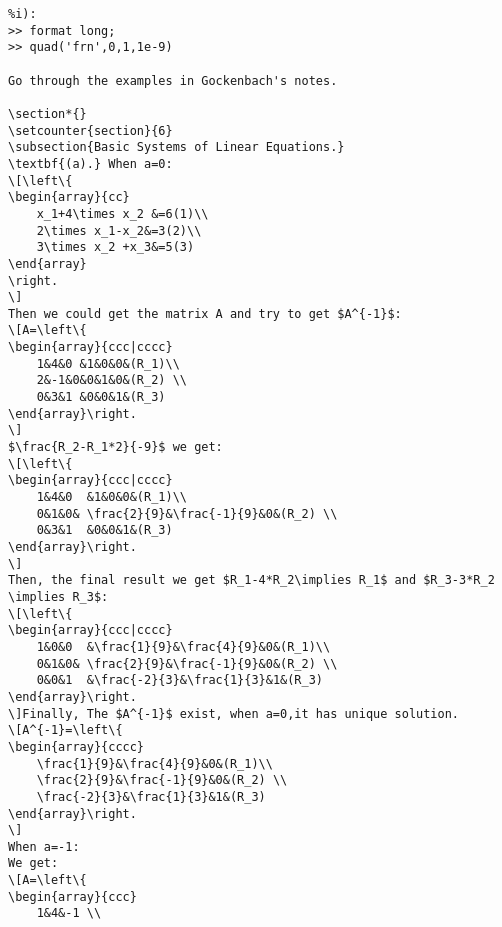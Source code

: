 \begin{verbatim}
%i):
>> format long;
>> quad('frn',0,1,1e-9)

Go through the examples in Gockenbach's notes.

\section*{}
\setcounter{section}{6}
\subsection{Basic Systems of Linear Equations.}
\textbf{(a).} When a=0:
\[\left\{
\begin{array}{cc}
    x_1+4\times x_2 &=6(1)\\
    2\times x_1-x_2&=3(2)\\
    3\times x_2 +x_3&=5(3)
\end{array}
\right.
\]
Then we could get the matrix A and try to get $A^{-1}$:
\[A=\left\{
\begin{array}{ccc|cccc}
    1&4&0 &1&0&0&(R_1)\\
    2&-1&0&0&1&0&(R_2) \\
    0&3&1 &0&0&1&(R_3)
\end{array}\right.
\]
$\frac{R_2-R_1*2}{-9}$ we get:
\[\left\{
\begin{array}{ccc|cccc}
    1&4&0  &1&0&0&(R_1)\\
    0&1&0& \frac{2}{9}&\frac{-1}{9}&0&(R_2) \\
    0&3&1  &0&0&1&(R_3)
\end{array}\right.
\]
Then, the final result we get $R_1-4*R_2\implies R_1$ and $R_3-3*R_2 \implies R_3$:
\[\left\{
\begin{array}{ccc|cccc}
    1&0&0  &\frac{1}{9}&\frac{4}{9}&0&(R_1)\\
    0&1&0& \frac{2}{9}&\frac{-1}{9}&0&(R_2) \\
    0&0&1  &\frac{-2}{3}&\frac{1}{3}&1&(R_3)
\end{array}\right.
\]Finally, The $A^{-1}$ exist, when a=0,it has unique solution.
\[A^{-1}=\left\{
\begin{array}{cccc}
    \frac{1}{9}&\frac{4}{9}&0&(R_1)\\
    \frac{2}{9}&\frac{-1}{9}&0&(R_2) \\
    \frac{-2}{3}&\frac{1}{3}&1&(R_3)
\end{array}\right.
\]
When a=-1:
We get:
\[A=\left\{
\begin{array}{ccc}
    1&4&-1 \\

\end{verbatim}
